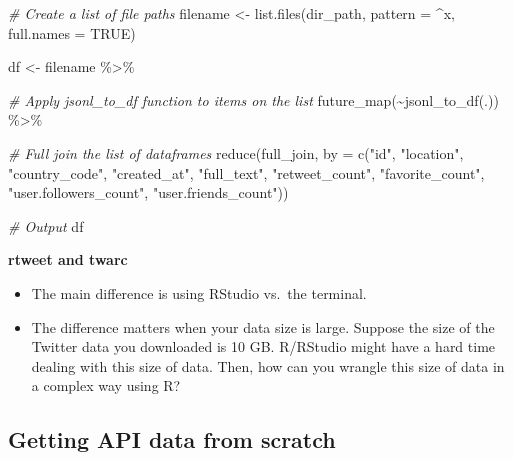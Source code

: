 \documentclass[
]{book}
\newenvironment{Shaded}{\begin{snugshade}}{\end{snugshade}}
\newcommand{\AttributeTok}[1]{\textcolor[rgb]{0.77,0.63,0.00}{#1}}
\newcommand{\CommentTok}[1]{\textcolor[rgb]{0.56,0.35,0.01}{\textit{#1}}}
\newcommand{\ConstantTok}[1]{\textcolor[rgb]{0.00,0.00,0.00}{#1}}
\newcommand{\FunctionTok}[1]{\textcolor[rgb]{0.00,0.00,0.00}{#1}}
\newcommand{\NormalTok}[1]{#1}
\newcommand{\OtherTok}[1]{\textcolor[rgb]{0.56,0.35,0.01}{#1}}
\newcommand{\SpecialCharTok}[1]{\textcolor[rgb]{0.00,0.00,0.00}{#1}}
\newcommand{\StringTok}[1]{\textcolor[rgb]{0.31,0.60,0.02}{#1}}
\begin{document}
\begin{Shaded}
\begin{Highlighting}[]
\CommentTok{\# Create a list of file paths }
\NormalTok{filename }\OtherTok{\textless{}{-}} \FunctionTok{list.files}\NormalTok{(dir\_path,}
          \AttributeTok{pattern =} \StringTok{\textquotesingle{}\^{}x\textquotesingle{}}\NormalTok{,}
          \AttributeTok{full.names =} \ConstantTok{TRUE}\NormalTok{)}

\NormalTok{df }\OtherTok{\textless{}{-}}\NormalTok{ filename }\SpecialCharTok{\%\textgreater{}\%}

\CommentTok{\# Apply jsonl\_to\_df function to items on the list}
\FunctionTok{future\_map}\NormalTok{(}\SpecialCharTok{\textasciitilde{}}\FunctionTok{jsonl\_to\_df}\NormalTok{(.)) }\SpecialCharTok{\%\textgreater{}\%}

\CommentTok{\# Full join the list of dataframes}
\FunctionTok{reduce}\NormalTok{(full\_join,}
       \AttributeTok{by =} \FunctionTok{c}\NormalTok{(}\StringTok{"id"}\NormalTok{,}
              \StringTok{"location"}\NormalTok{,}
              \StringTok{"country\_code"}\NormalTok{,}
              \StringTok{"created\_at"}\NormalTok{,}
              \StringTok{"full\_text"}\NormalTok{,}
              \StringTok{"retweet\_count"}\NormalTok{,}
              \StringTok{"favorite\_count"}\NormalTok{,}
              \StringTok{"user.followers\_count"}\NormalTok{,}
              \StringTok{"user.friends\_count"}\NormalTok{))}

\CommentTok{\# Output}
\NormalTok{df}
\end{Highlighting}
\end{Shaded}

\textbf{rtweet and twarc}

\begin{itemize}
\item
  The main difference is using RStudio vs.~the terminal.
\item
  The difference matters when your data size is large. Suppose the size of the Twitter data you downloaded is 10 GB. R/RStudio might have a hard time dealing with this size of data. Then, how can you wrangle this size of data in a complex way using R?
\end{itemize}

\hypertarget{getting-api-data-from-scratch}{%
\subsection{Getting API data from scratch}\label{getting-api-data-from-scratch}}
\end{document}
